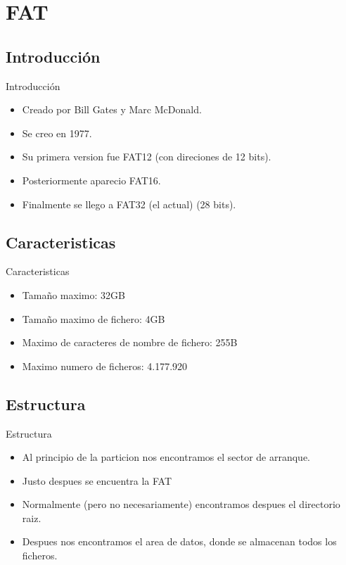 \section{FAT}
\subsection{Introducción}
\begin{frame}{Introducción}
  \begin{itemize}
    \item Creado por Bill Gates y Marc McDonald.
    \item Se creo en 1977.
    \item Su primera version fue FAT12 (con direciones de 12 bits).
    \item Posteriormente aparecio FAT16.
    \item Finalmente se llego a FAT32 (el actual) (28 bits).
  \end{itemize}
\end{frame}

\subsection{Caracteristicas}
\begin{frame}{Caracteristicas}
  \begin{itemize}
    \item Tamaño maximo: 32GB
    \item Tamaño maximo de fichero: 4GB
    \item Maximo de caracteres de nombre de fichero: 255B
    \item Maximo numero de ficheros: 4.177.920
  \end{itemize}
\end{frame}

\subsection{Estructura}
\begin{frame}{Estructura}
  \begin{itemize}
    \item Al principio de la particion nos encontramos el sector de arranque.
    \item Justo despues se encuentra la FAT
    \item Normalmente (pero no necesariamente) encontramos despues el directorio raiz.
    \item Despues nos encontramos el area de datos, donde se almacenan todos los ficheros.
  \end{itemize}
\end{frame}

